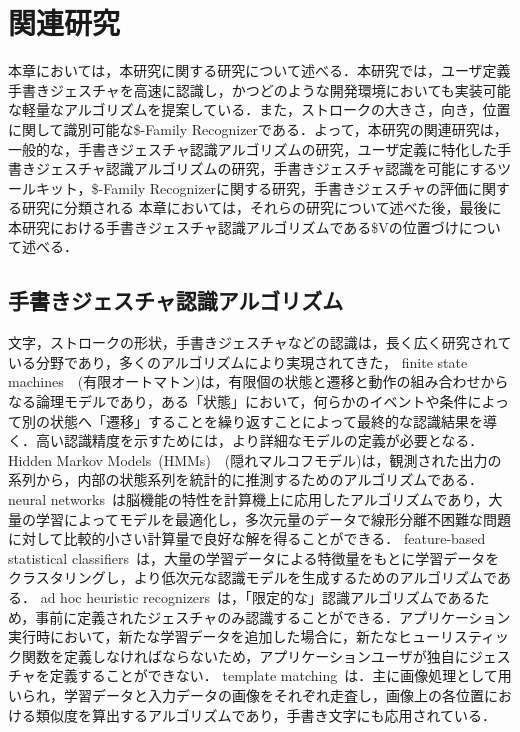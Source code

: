 \chapter{関連研究}
本章においては，本研究に関する研究について述べる．本研究では，ユーザ定義手書きジェスチャを高速に認識し，かつどのような開発環境においても実装可能な軽量なアルゴリズムを提案している．また，ストロークの大きさ，向き，位置に関して識別可能な\$-Family Recognizerである．よって，本研究の関連研究は，一般的な，手書きジェスチャ認識アルゴリズムの研究，ユーザ定義に特化した手書きジェスチャ認識アルゴリズムの研究，手書きジェスチャ認識を可能にするツールキット，\$-Family Recognizerに関する研究，手書きジェスチャの評価に関する研究に分類される
本章においては，それらの研究について述べた後，最後に本研究における手書きジェスチャ認識アルゴリズムである\$Vの位置づけについて述べる．

\section{手書きジェスチャ認識アルゴリズム}
文字，ストロークの形状，手書きジェスチャなどの認識は，長く広く研究されている分野であり，多くのアルゴリズムにより実現されてきた，
finite state machines~\cite{Hong00constructingfinite}~(有限オートマトン)は，有限個の状態と遷移と動作の組み合わせからなる論理モデルであり，ある「状態」において，何らかのイベントや条件によって別の状態へ「遷移」することを繰り返すことによって最終的な認識結果を導く．高い認識精度を示すためには，より詳細なモデルの定義が必要となる．
Hidden Markov Models~(HMMs)~\cite{Anderson2004HiddenMM,Sezgin:2005:HES:1040830.1040899, Cao:2005:EOA:1089508.1089540}~(隠れマルコフモデル)は，観測された出力の系列から，内部の状態系列を統計的に推測するためのアルゴリズムである．
neural networks~\cite{Pittman:1991:RHT:108844.108914}は脳機能の特性を計算機上に応用したアルゴリズムであり，大量の学習によってモデルを最適化し，多次元量のデータで線形分離不困難な問題に対して比較的小さい計算量で良好な解を得ることができる．
feature-based statistical classifiers~\cite{Cho:2006:NGR:1711617.1711649,Rubine:1991:SGE:127719.122753}は，大量の学習データによる特徴量をもとに学習データをクラスタリングし，より低次元な認識モデルを生成するためのアルゴリズムである．
ad hoc heuristic recognizers~\cite{Anthony:2010:LMR:1839214.1839258, Wilson:2003:XUI:642611.642706}は，「限定的な」認識アルゴリズムであるため，事前に定義されたジェスチャのみ認識することができる．アプリケーション実行時において，新たな学習データを追加した場合に，新たなヒューリスティック関数を定義しなければならないため，アプリケーションユーザが独自にジェスチャを定義することができない．
template matching~\cite{Kara:2005:ITS:1652319.1652712, Kristensson:2004:SLV:1029632.1029640}は．主に画像処理として用いられ，学習データと入力データの画像をそれぞれ走査し，画像上の各位置における類似度を算出するアルゴリズムであり，手書き文字にも応用されている．

